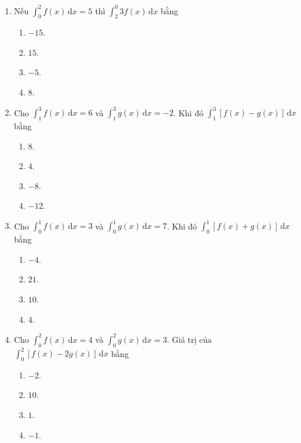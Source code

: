 \documentclass[12pt]{article}
\begin{document}
\begin{enumerate}[label=\textbf{Câu \arabic*.}]
		\item Nếu $\displaystyle \int_0^2 f(x)\,\mathrm{d}x = 5$ thì $\displaystyle \int_2^0 3f(x)\,\mathrm{d}x$ bằng
		\begin{multicols}{4}
			\begin{enumerate}[label=\textbf{\Alph*.}]
				\item $-15$.
				\item $15$.
				\item $-5$.
				\item $8$.
			\end{enumerate}
		\end{multicols}
		
		\item Cho $\displaystyle \int_1^3 f(x)\,\mathrm{d}x = 6$ và $\displaystyle \int_1^3 g(x)\,\mathrm{d}x = -2$. Khi đó $\displaystyle \int_1^3 [f(x) - g(x)]\,\mathrm{d}x$ bằng
		\begin{multicols}{4}
			\begin{enumerate}[label=\textbf{\Alph*.}]
				\item $8$.
				\item $4$.
				\item $-8$.
				\item $-12$.
			\end{enumerate}
		\end{multicols}
		
		\item Cho $\displaystyle \int_0^1 f(x)\,\mathrm{d}x = 3$ và $\displaystyle \int_0^1 g(x)\,\mathrm{d}x = 7$. Khi đó $\displaystyle \int_0^1 [f(x) + g(x)]\,\mathrm{d}x$ bằng
		\begin{multicols}{4}
			\begin{enumerate}[label=\textbf{\Alph*.}]
				\item $-4$.
				\item $21$.
				\item $10$.
				\item $4$.
			\end{enumerate}
		\end{multicols}
		
		\item Cho $\displaystyle \int_0^2 f(x)\,\mathrm{d}x = 4$ và $\displaystyle \int_0^2 g(x)\,\mathrm{d}x = 3$. Giá trị của $\displaystyle \int_0^2 [f(x) - 2g(x)]\,\mathrm{d}x$ bằng
		\begin{multicols}{4}
			\begin{enumerate}[label=\textbf{\Alph*.}]
				\item $-2$.
				\item $10$.
				\item $1$.
				\item $-1$.
			\end{enumerate}
		\end{multicols}
		

\end{enumerate}
\end{document}
